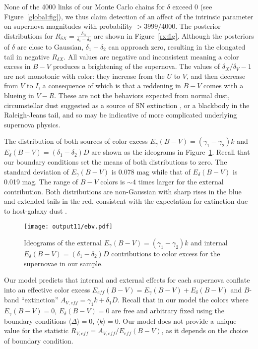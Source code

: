 \documentclass{aastex}   	%
\begin{document}
None of the 4000 links of
our Monte Carlo chains for $\delta$ exceed 0 (see Figure~\ref{global:fig}), we thus claim detection of an affect of the
intrinsic parameter on supernova magnitudes
with probability $>3999/4000$. 
The posterior distributions for $R_{\delta X}=\frac{\delta_X}{\delta_1-\delta_2}$ are shown in Figure~\ref{rx:fig}.
Although the posteriors of $\delta$ are close to Gaussian, $\delta_1-\delta_2$ can approach zero, resulting in the
elongated tail in negative  $R_{\delta X}$.
All values are negative and inconsistent meaning a color excess in $B-V$ produces a brightening of the supernova.
The values of $\delta_X/\delta_V-1$ are not monotonic with color: they increase from the $U$ to $V$, and then decrease
from $V$ to $I$,
a consequence
of which is that
a reddening in $B-V$ comes with a blueing in $V-R$.
These are not the behaviors expected from normal dust,
circumstellar dust suggested as a source of SN extinction \citep{2005ApJ...635L..33W,2008ApJ...686L.103G,
2015ApJ...807L..26G}, or a blackbody in the Raleigh-Jeans tail, and so may be indicative of
more complicated underlying supernova physics.

The distribution of both sources of color excess $E_\gamma(B-V) =(\gamma_1-\gamma_2)k$ and
 $E_\delta(B-V) = (\delta_1-\delta_2)D$ are shown as the ideograms in Figure~\ref{ebv:fig}.
Recall that our boundary conditions set the means of both distributions to zero. 
The standard deviation of $E_\gamma(B-V)$ is 0.078 mag while that of $E_\delta(B-V)$ is 0.019 mag.
The range of $B-V$ colors is $\sim 4$ times larger for the external contribution. 
Both distributions are non-Gaussian with sharp rises in the blue and extended tails in the red, consistent
with the expectation for extinction due to host-galaxy dust \citep{1998ApJ...502..177H}.

\begin{figure}[htbp] %
   \centering
   \texttt{[image: output11/ebv.pdf]}
   \caption{Ideograms of the external $E_\gamma(B-V) =(\gamma_1-\gamma_2)k$ and
   internal $E_\delta(B-V) = (\delta_1-\delta_2)D$  contributions to color excess  for the supernovae in our sample.
   \label{ebv:fig}}
\end{figure}

Our model predicts that internal and external effects for each supernova  conflate into an effective color excess
$E_{eff}(B-V) = E_\gamma(B-V) + E_\delta(B-V)$ and $B$-band ``extinction''
$A_{V, eff} = \gamma_1 k + \delta_1D$.
Recall that in our model the colors where $E_\gamma(B-V)=0$,  $E_\delta(B-V)=0$ are free and arbitrary
fixed using the  boundary conditions $\langle \Delta \rangle = 0$, $\langle k \rangle = 0$.
Our model does not provide a unique value for the statistic $R_{V,eff} = A_{V, eff} /E_{eff}(B-V)$, as it depends on the choice of  boundary condition.
\end{document}
